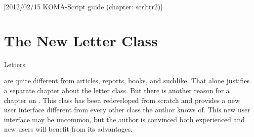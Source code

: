 %
%
%
%
%
%
%
%
% 
%
%
%
%

[2012/02/15 KOMA-Script guide (chapter: scrlttr2)]



\chapter{The New Letter Class }

%
\iffalse
  Since the June 2002 release {\KOMAScript} provides a completely
  rewritten letter class\ChangedAt{v2.8q}{\Class{scrlttr2}}. Although
  part of the code is identical to that of the main classes described
  in \autoref{cha:maincls}, letters
\else
  Letters
\fi
are quite different from articles,
reports, books, and suchlike.  That alone justifies a separate
chapter about the letter class. But there is another reason for a
chapter on . This class has been redeveloped from
scratch and provides a new user interface different from every other
class the author knows of. This new user interface may be uncommon,
but the author is convinced both experienced and new {\KOMAScript}
users will benefit from its advantages.


